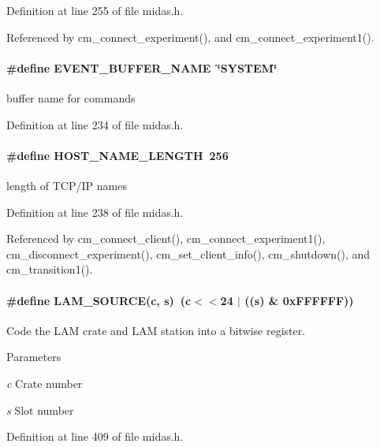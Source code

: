Definition at line 255 of file midas.h.

Referenced by cm\_\-connect\_\-experiment(), and cm\_\-connect\_\-experiment1().
\paragraph[{EVENT\_\-BUFFER\_\-NAME}]{\setlength{\rightskip}{0pt plus 5cm}\#define EVENT\_\-BUFFER\_\-NAME~\char`\"{}SYSTEM\char`\"{}}\hfill\label{group__midasincludecode_gab520c690db83550e545ce6afbb12de3f}
buffer name for commands 

Definition at line 234 of file midas.h.
\paragraph[{HOST\_\-NAME\_\-LENGTH}]{\setlength{\rightskip}{0pt plus 5cm}\#define HOST\_\-NAME\_\-LENGTH~256}\hfill\label{group__midasincludecode_ga2010c9ed4ef21c3171de778157b9c494}
length of TCP/IP names 

Definition at line 238 of file midas.h.

Referenced by cm\_\-connect\_\-client(), cm\_\-connect\_\-experiment1(), cm\_\-disconnect\_\-experiment(), cm\_\-set\_\-client\_\-info(), cm\_\-shutdown(), and cm\_\-transition1().
\paragraph[{LAM\_\-SOURCE}]{\setlength{\rightskip}{0pt plus 5cm}\#define LAM\_\-SOURCE(c, \/  s)~(c$<$$<$24 $|$ ((s) \& 0xFFFFFF))}\hfill\label{group__midasincludecode_ga93fde3913a488880c4f96267e24579ee}
Code the LAM crate and LAM station into a bitwise register. 
\begin{DoxyParams}{Parameters}
\item[{\em c}]Crate number \item[{\em s}]Slot number \end{DoxyParams}


Definition at line 409 of file midas.h.
